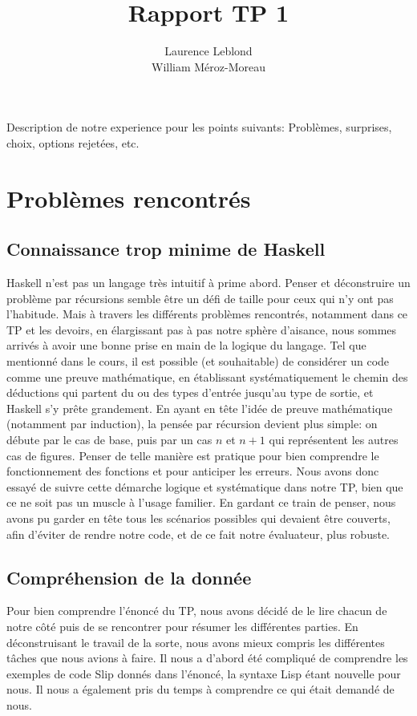 \documentclass{article}
\title{Rapport TP 1}
\author{Laurence Leblond \\ William Méroz-Moreau}
\begin{document}
	\maketitle

	Description de notre experience pour les points suivants: Problèmes, surprises,
	choix, options rejetées, etc.

	\section{Problèmes rencontrés}

	\subsection{Connaissance trop minime de Haskell}

	Haskell n'est pas un langage très intuitif à prime abord. Penser et
	déconstruire un problème par récursions semble être un défi de taille pour
	ceux qui n'y ont pas l'habitude. Mais à travers les différents problèmes rencontrés,
	notamment dans ce TP et les devoirs, en élargissant pas à pas notre sphère d'aisance,
	nous sommes arrivés à avoir une bonne prise en main de la logique du langage. Tel
	que mentionné dans le cours, il est possible (et souhaitable) de considérer un
	code comme une preuve mathématique, en établissant systématiquement le chemin des
	déductions qui partent du ou des types d'entrée jusqu'au type de sortie, et
	Haskell s'y prête grandement. En ayant en tête l'idée de preuve mathématique (notamment
	par induction), la pensée par récursion devient plus simple: on débute par le cas
	de base, puis par un cas $n$ et $n+1$ qui représentent les autres cas de
	figures. Penser de telle manière est pratique pour bien comprendre le fonctionnement
	des fonctions et pour anticiper les erreurs. Nous avons donc essayé de suivre
	cette démarche logique et systématique dans notre TP, bien que ce ne soit pas un
	muscle à l'usage familier. En gardant ce train de penser, nous avons pu garder
	en tête tous les scénarios possibles qui devaient être couverts, afin d'éviter
	de rendre notre code, et de ce fait notre évaluateur, plus robuste.

	\subsection{Compréhension de la donnée}

	Pour bien comprendre l'énoncé du TP, nous avons décidé de le lire chacun de
	notre côté puis de se rencontrer pour résumer les différentes parties. En déconstruisant
	le travail de la sorte, nous avons mieux compris les différentes tâches que
	nous avions à faire. Il nous a d'abord été compliqué de comprendre les exemples
	de code Slip donnés dans l'énoncé, la syntaxe Lisp étant nouvelle pour nous. Il
	nous a également pris du temps à comprendre ce qui était demandé de nous.
\end{document}
